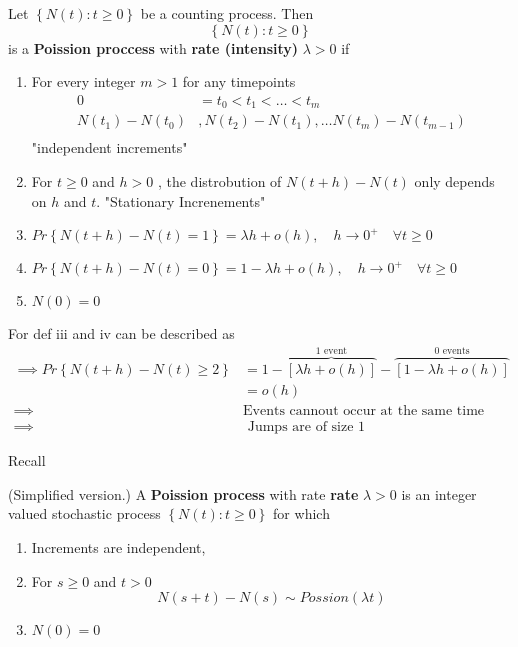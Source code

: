 \documentclass{article}
\theoremstyle{remark}
\begin{document}
\begin{definition}
  Let $\left\{ N\left( t \right) : t \ge 0 \right\}$ be a counting process.  Then \[
  \left\{ N\left( t \right): t \ge 0 \right\} 
  \] is  a \textbf{Poission proccess}  with \textbf{rate (intensity)}  $\lambda > 0 $  if 

  \begin{enumerate}[label=(\roman*)]
    \item For every integer $m> 1$ for any timepoints \[
        \begin{split}
    0  & = t_{0} < t_{1} < \ldots < t_{m} \\
    N\left( t_{1} \right) - N\left( t_{0} \right)  & , N\left( t_{2} \right) - N\left( t_{1} \right), \ldots N\left( t_{m} \right) - N\left( t_{m-1} \right)  \\
        \end{split} 
    \] 
    "independent increments"
  \item For $t\ge 0$ and $h > 0$ ,  the distrobution of $N\left( t + h \right) - N\left( t \right)$  only depends on $h$ and $t$.
    "Stationary Increnements" 
  \item  $Pr \left \{ N\left( t + h \right) - N\left( t \right) = 1 \right \}  = \lambda  h + o\left( h \right), \quad h \to 0^{+} \quad   \forall t\ge0 $
  \item $Pr \left \{ N\left( t + h \right) - N\left( t \right) = 0 \right \}  = 1 - \lambda h  + o\left( h \right),  \quad h\to 0^{+} \quad  \forall t\ge 0  $
  \item $N\left( 0 \right) = 0$

  \end{enumerate}
  For def iii and iv can be described as \[
  \begin{split}
    \implies  Pr \left \{ N\left( t + h \right) - N\left( t \right) \ge 2  \right \}  &=  1 - \overbrace{\left[ \lambda h + o\left( h \right) \right] }^{ 1 \text{ event}} - \overbrace{\left[ 1 - \lambda h + o\left( h \right) \right]}^{0 \text{ events}}  \\
    &= o\left( h \right) \\
    \implies  & \text{Events cannout occur at the same time} \\
    \implies  &  \text{ Jumps are of size 1}
  \end{split} 
  \] 
\end{definition}

Recall

\begin{definition}
  (Simplified version.) A \textbf{Poission process}  with rate \textbf{rate}  $\lambda > 0$ is an integer valued  stochastic process $\left\{ N\left( t \right) : t \ge 0 \right\}$ for which 
  \begin{enumerate}[label=(\roman*)]
    \item Increments are independent,
    \item For $s \ge 0$ and $t > 0$ \[
    N\left( s+t \right) - N\left( s \right) \sim Possion\left( \lambda t \right)
    \] 
  \item $N\left( 0 \right) = 0$
  \end{enumerate}
\end{definition}
\end{document}
